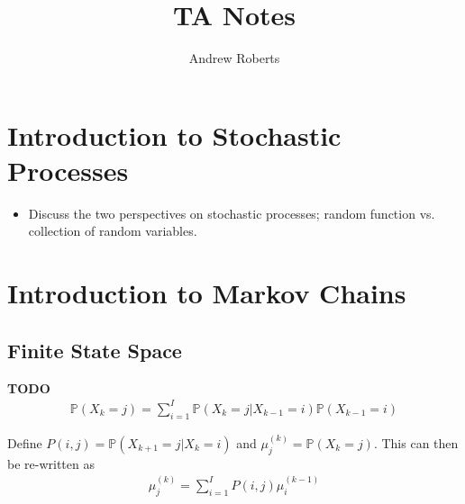 \documentclass[12pt]{article}
\title{TA Notes}
\author{Andrew Roberts}
\newcommand{\Prob}{\mathbb{P}}
\begin{document}
\maketitle
\tableofcontents
\newpage

\section{Introduction to Stochastic Processes}
\begin{itemize}
\item Discuss the two perspectives on stochastic processes; random function vs. collection of random variables. 
\end{itemize}

\section{Introduction to Markov Chains}

\subsection{Finite State Space}
\textbf{TODO}
\begin{align}
\Prob(X_k = j) = \sum_{i = 1}^{I} \Prob(X_k = j|X_{k - 1} = i)\Prob(X_{k - 1} = i)
\end{align}

Define $P(i, j) = \Prob(X_{k+1} = j|X_k = i)$ and $\mu^{(k)}_j = \Prob(X_k = j)$. This can then be re-written as 
\begin{align}
\mu^{(k)}_j = \sum_{i = 1}^{I} P(i, j) \mu^{(k-1)}_i \label{discrete_transition}
\end{align}
\end{document}
